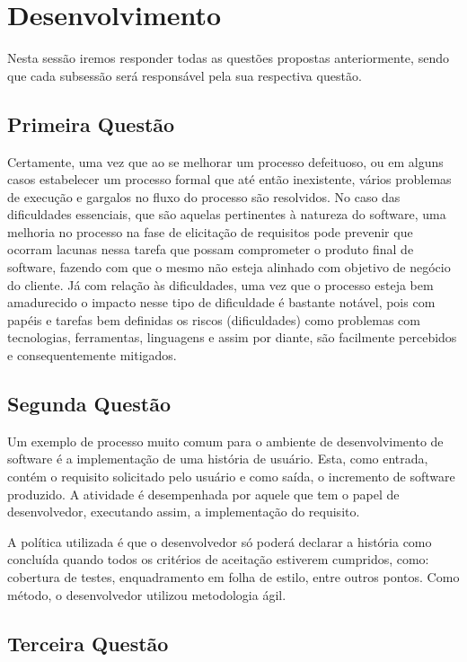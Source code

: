 \chapter[Desenvolvimento ]{Desenvolvimento}

Nesta sessão iremos responder todas as questões propostas anteriormente, sendo
que cada subsessão será responsável pela sua respectiva questão.

\section{Primeira Questão}
\label{sec:Primeira Questão}

Certamente, uma vez que ao se melhorar um processo defeituoso, ou em alguns casos estabelecer um processo formal que até então inexistente, vários problemas
de execução e gargalos no fluxo do processo são resolvidos. No caso das dificuldades essenciais, que são aquelas pertinentes à natureza do software, uma
melhoria no processo na fase de elicitação de requisitos pode prevenir que ocorram lacunas nessa tarefa que possam comprometer o produto final de software,
fazendo com que o mesmo não esteja alinhado com objetivo de negócio do cliente. Já com relação às dificuldades, uma vez que o processo esteja bem amadurecido
o impacto nesse tipo de dificuldade é bastante notável, pois com papéis e tarefas bem definidas os riscos (dificuldades) como problemas com tecnologias, ferramentas,
linguagens e assim por diante, são facilmente percebidos e consequentemente mitigados.

\section{Segunda Questão}
\label{sec:Segunda Questão}

Um exemplo de processo muito comum para o ambiente de desenvolvimento de software
é a implementação de uma história de usuário. Esta, como entrada, contém o
requisito solicitado pelo usuário e como saída, o incremento de software produzido.
A atividade é desempenhada por aquele que tem o papel de desenvolvedor, executando
assim, a implementação do requisito.

A política utilizada é que o desenvolvedor só poderá declarar a história como
concluída quando todos os critérios de aceitação estiverem cumpridos, como:
cobertura de testes, enquadramento em folha de estilo, entre outros pontos. Como
método, o desenvolvedor utilizou metodologia ágil.

\section{Terceira Questão}
\label{sec:Terceira Questão}

